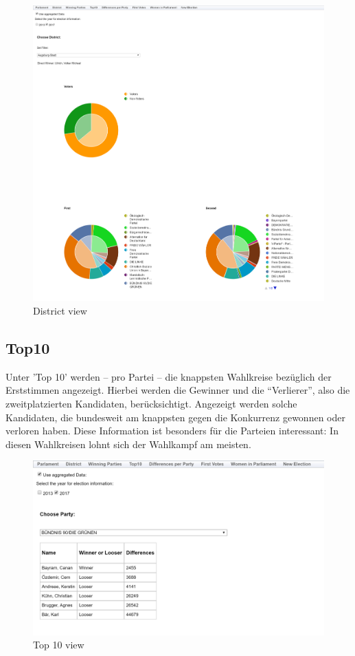 \documentclass[a4paper]{scrreprt}
\begin{document}
\begin{figure}[H]
\centering
\includegraphics[width=\textwidth]{images/district.png}
\caption {District view}
\end{figure}

\subsection{Top10}

Unter 'Top 10' werden -- pro Partei -- die knappsten Wahlkreise bezüglich der Erststimmen angezeigt.
Hierbei werden die Gewinner und die "`Verlierer"', also die zweitplatzierten Kandidaten, berücksichtigt.
Angezeigt werden solche Kandidaten, die bundesweit am knappsten gegen die Konkurrenz gewonnen oder verloren haben.
Diese Information ist besonders für die Parteien interessant: In diesen Wahlkreisen lohnt sich der Wahlkampf am meisten.

\begin{figure}[H]
\centering
\includegraphics[width=\textwidth]{images/top10.png}
\caption {Top 10 view}
\end{figure}
\end{document}
